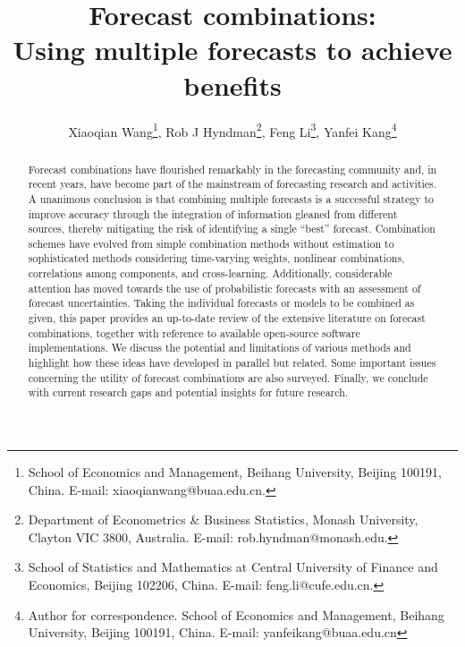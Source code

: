 \documentclass[11pt]{article}
\begin{document}
\def\spacingset#1{\renewcommand{\baselinestretch}%
{#1}\small\normalsize} \spacingset{1.2}

\title{\bf
Forecast combinations: \\Using multiple forecasts to achieve benefits
}

\author{Xiaoqian Wang\footnote{School of Economics and Management, Beihang University,
    Beijing 100191, China. E-mail: xiaoqianwang@buaa.edu.cn.}, Rob J
  Hyndman\footnote{Department of Econometrics \& Business Statistics, Monash University,
    Clayton VIC 3800, Australia. E-mail: rob.hyndman@monash.edu.}, Feng Li\footnote{School
    of Statistics and Mathematics at Central University of Finance and Economics, Beijing
    102206, China. E-mail: feng.li@cufe.edu.cn.}, Yanfei Kang\footnote{Author for
    correspondence. School of Economics and Management, Beihang University, Beijing
    100191, China. E-mail: yanfeikang@buaa.edu.cn}}

\maketitle

\bigskip
\begin{abstract}
Forecast combinations have flourished remarkably in the forecasting community and, in recent years, have become part of the mainstream of forecasting research and activities. A unanimous conclusion is that combining multiple forecasts is a successful strategy to improve accuracy through the integration of information gleaned from different sources, thereby mitigating the risk of identifying a single ``best'' forecast. Combination schemes have evolved from simple combination methods without estimation to sophisticated methods considering time-varying weights, nonlinear combinations, correlations among components, and cross-learning. Additionally, considerable attention has moved towards the use of probabilistic forecasts with an assessment of forecast uncertainties. Taking the individual forecasts or models to be combined as given, this paper provides an up-to-date review of the extensive literature on forecast combinations, together with reference to available open-source software implementations. We discuss the potential and limitations of various methods and highlight how these ideas have developed in parallel but related. Some important issues concerning the utility of forecast combinations are also surveyed. Finally, we conclude with current research gaps and potential insights for future research.
\end{abstract}
\end{document}

